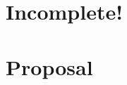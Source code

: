 \documentclass[10pt]{article}
\newcommand{\ali}[1]{{\color{Red}[al2: #1]}}
\begin{document}
\section*{Incomplete!}
\section*{Proposal}






\end{document}
